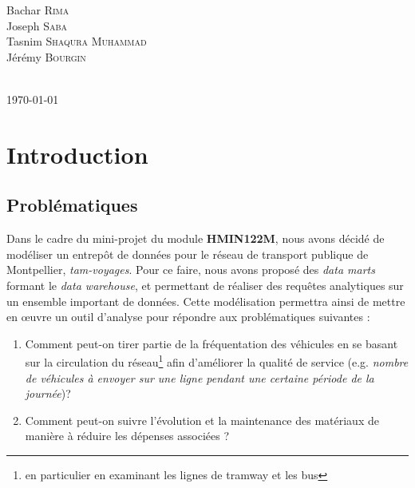 \documentclass[a4paper,12pt]{report}
\begin{document}
\begin{titlepage}
\begin{minipage}{\textwidth}
\centering \huge
Bachar \textsc{Rima}\\ %
Joseph \textsc{Saba}\\ %
Tasnim \textsc{Shaqura Muhammad}\\ %
Jérémy \textsc{Bourgin} %
\end{minipage} \\[0.8cm]
{\large \today}\\[1cm]
\hspace{\fill}
\vfill %
\end{titlepage}

\pagestyle{plain}

{
  \hypersetup{linkcolor=black}
  \tableofcontents
}

\newpage

\chapter{Introduction}
\section{Problématiques}
Dans le cadre du mini-projet du module \textbf{HMIN122M}, nous avons décidé de modéliser un entrepôt de données pour le réseau de transport publique de Montpellier, \textit{tam-voyages}. Pour ce faire, nous avons proposé des \textit{data marts} formant le \textit{data warehouse}, et permettant de réaliser des requêtes analytiques sur un ensemble important de données. Cette modélisation permettra ainsi de mettre en \oe{}uvre un outil d'analyse pour répondre aux problématiques suivantes :
\begin{enumerate}
  \item Comment peut-on tirer partie de la fréquentation des véhicules en se basant sur la circulation du réseau\footnote{en particulier en examinant les lignes de tramway et les bus} afin d'améliorer la qualité de service (e.g. \textit{nombre de véhicules à envoyer sur une ligne pendant une certaine période de la journée})?
  \item Comment peut-on suivre l'évolution et la maintenance des matériaux de manière à réduire les dépenses associées ?
\end{enumerate}
\end{document}
